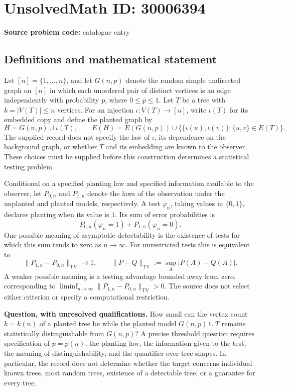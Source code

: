 \documentclass[11pt]{article}
\begin{document}
\section*{UnsolvedMath ID: 30006394}
\textbf{Source problem code:} catalogue entry
\subsection{Definitions and mathematical statement}
Let \([n]=\{1,\ldots,n\}\), and let \(G(n,p)\) denote the random simple undirected graph on \([n]\) in which each unordered pair of distinct vertices is an edge independently with probability \(p\), where \(0\leq p\leq1\). Let \(T\) be a tree with \(k=|V(T)|\leq n\) vertices. For an injection \(\iota:V(T)\to[n]\), write \(\iota(T)\) for its embedded copy and define the planted graph by
\[
H=G(n,p)\cup\iota(T),\qquad
E(H)=E(G(n,p))\cup\{\{\iota(u),\iota(v)\}:\{u,v\}\in E(T)\}.
\]
The supplied record does not specify the law of \(\iota\), its dependence on the background graph, or whether \(T\) and its embedding are known to the observer. These choices must be supplied before this construction determines a statistical testing problem.

Conditional on a specified planting law and specified information available to the observer, let \(P_{0,n}\) and \(P_{1,n}\) denote the laws of the observation under the unplanted and planted models, respectively. A test \(\varphi_n\), taking values in \(\{0,1\}\), declares planting when its value is \(1\). Its sum of error probabilities is
\[
P_{0,n}(\varphi_n=1)+P_{1,n}(\varphi_n=0).
\]
One possible meaning of asymptotic detectability is the existence of tests for which this sum tends to zero as \(n\to\infty\). For unrestricted tests this is equivalent to
\[
\|P_{1,n}-P_{0,n}\|_{\mathrm{TV}}\longrightarrow1,
\qquad
\|P-Q\|_{\mathrm{TV}}:=\sup_A|P(A)-Q(A)|.
\]
A weaker possible meaning is a testing advantage bounded away from zero, corresponding to \(\liminf_{n\to\infty}\|P_{1,n}-P_{0,n}\|_{\mathrm{TV}}>0\). The source does not select either criterion or specify a computational restriction.

\textbf{Question, with unresolved qualifications.} How small can the vertex count \(k=k(n)\) of a planted tree be while the planted model \(G(n,p)\cup T\) remains statistically distinguishable from \(G(n,p)\)? A precise threshold question requires specification of \(p=p(n)\), the planting law, the information given to the test, the meaning of distinguishability, and the quantifier over tree shapes. In particular, the record does not determine whether the target concerns individual known trees, most random trees, existence of a detectable tree, or a guarantee for every tree.
\end{document}
